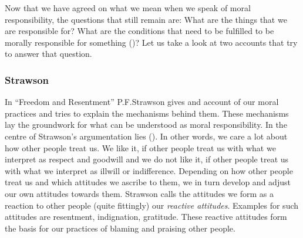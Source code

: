 \documentclass{article}
\begin{document}

Now that we have agreed on what we mean when we speak of moral responsibility,
the questions that still remain are: What are the things that we are responsible
for? What are the conditions that need to be fulfilled to be morally responsible
for something (\cite[p. 370]{smith2008control})? Let us take a look at two
accounts that try to answer that question.





%
%
%

\subsubsection{Strawson}


%
In ``Freedom and Resentment'' P.F.Strawson gives and account of our moral
practices and tries to explain the mechanisms behind them. These mechanisms lay
the groundwork for what can be understood as moral responsibility.
In the centre of Strawson's argumentation lies (\cite[p.5]{Strawson1962}). In other words, we care a lot about how other
people treat us. We like it, if other people treat us with what we interpret as
respect and goodwill and we do not like it, if other people treat us with what
we interpret as illwill or indifference. Depending on how other people treat us
and which attitudes we ascribe to them, we in turn develop and adjust our own
attitudes towards them. Strawson calls the attitudes we form as a reaction to
other people (quite fittingly) our \textit{reactive
attitudes}. Examples for such attitudes are resentment, indignation, gratitude.
These reactive attitudes form the basis for our practices of blaming and
praising other people.
\end{document}
